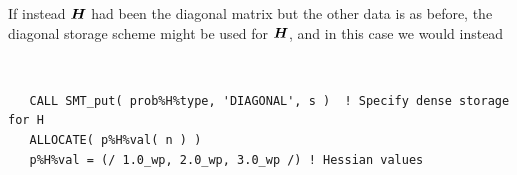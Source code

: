 \documentclass{galahad}
\begin{document}
If instead ${\bm{H}}$ had been the diagonal matrix
but the other data is as before, the diagonal storage scheme
might be used for ${\bm{H}}$, and in this case we would instead
{\tt \small
\begin{verbatim}
   CALL SMT_put( prob%H%type, 'DIAGONAL', s )  ! Specify dense storage for H
   ALLOCATE( p%H%val( n ) )
   p%H%val = (/ 1.0_wp, 2.0_wp, 3.0_wp /) ! Hessian values
\end{verbatim}
}
\noindent
\end{document}
